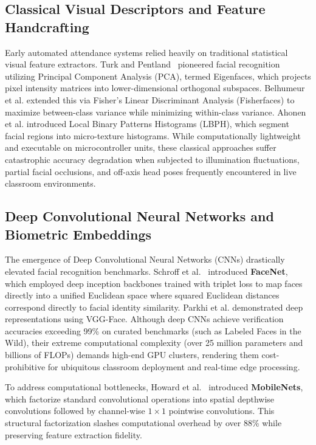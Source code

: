 \documentclass[conference]{IEEEtran}
\begin{document}
\subsection{Classical Visual Descriptors and Feature Handcrafting}
Early automated attendance systems relied heavily on traditional statistical visual feature extractors. Turk and Pentland~\cite{turk1991eigenfaces} pioneered facial recognition utilizing Principal Component Analysis (PCA), termed Eigenfaces, which projects pixel intensity matrices into lower-dimensional orthogonal subspaces. Belhumeur et al. extended this via Fisher's Linear Discriminant Analysis (Fisherfaces) to maximize between-class variance while minimizing within-class variance. Ahonen et al. introduced Local Binary Patterns Histograms (LBPH), which segment facial regions into micro-texture histograms. While computationally lightweight and executable on microcontroller units, these classical approaches suffer catastrophic accuracy degradation when subjected to illumination fluctuations, partial facial occlusions, and off-axis head poses frequently encountered in live classroom environments.

\subsection{Deep Convolutional Neural Networks and Biometric Embeddings}
The emergence of Deep Convolutional Neural Networks (CNNs) drastically elevated facial recognition benchmarks. Schroff et al.~\cite{schroff2015facenet} introduced \textbf{FaceNet}, which employed deep inception backbones trained with triplet loss to map faces directly into a unified Euclidean space where squared Euclidean distances correspond directly to facial identity similarity. Parkhi et al. demonstrated deep representations using VGG-Face. Although deep CNNs achieve verification accuracies exceeding 99\% on curated benchmarks (such as Labeled Faces in the Wild), their extreme computational complexity (over 25 million parameters and billions of FLOPs) demands high-end GPU clusters, rendering them cost-prohibitive for ubiquitous classroom deployment and real-time edge processing.

To address computational bottlenecks, Howard et al.~\cite{howard2017mobilenets} introduced \textbf{MobileNets}, which factorize standard convolutional operations into spatial depthwise convolutions followed by channel-wise $1 \times 1$ pointwise convolutions. This structural factorization slashes computational overhead by over 88\% while preserving feature extraction fidelity.
\end{document}
